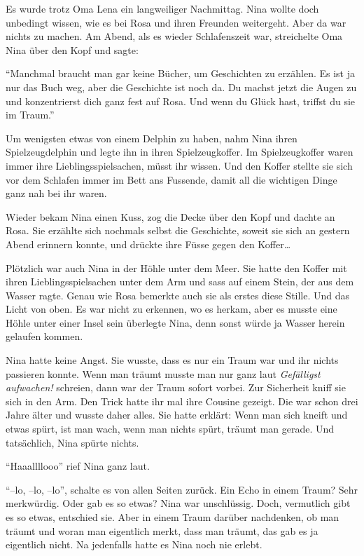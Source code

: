 \begin{mdframed}[style=mystyle]
Es wurde trotz Oma Lena ein langweiliger Nachmittag. Nina wollte doch unbedingt wissen, wie es bei Rosa und ihren Freunden weitergeht. Aber da war nichts zu machen. Am Abend, als es wieder Schlafenszeit war, streichelte Oma Nina über den Kopf und sagte:

\enquote{Manchmal braucht man gar keine Bücher, um Geschichten zu erzählen. Es ist ja nur das Buch weg, aber die Geschichte ist noch da. Du machst jetzt die Augen zu und konzentrierst dich ganz fest auf Rosa. Und wenn du Glück hast, triffst du sie im Traum.}

Um wenigsten etwas von einem Delphin zu haben, nahm Nina ihren Spielzeugdelphin und legte ihn in ihren Spielzeugkoffer. Im Spielzeugkoffer waren immer ihre Lieblingsspielsachen, müsst ihr wissen. Und den Koffer stellte sie sich vor dem Schlafen immer im Bett ans Fussende, damit all die wichtigen Dinge ganz nah bei ihr waren.

Wieder bekam Nina einen Kuss, zog die Decke über den Kopf und dachte an Rosa. Sie erzählte sich nochmals selbst die Geschichte, soweit sie sich an gestern Abend erinnern konnte, und drückte ihre Füsse gegen den Koffer\dots
\end{mdframed}\medskip

Plötzlich war auch Nina in der Höhle unter dem Meer. Sie hatte den Koffer mit ihren Lieblingsspielsachen unter dem Arm und sass auf einem Stein, der aus dem Wasser ragte. Genau wie Rosa bemerkte auch sie als erstes diese Stille. Und das Licht von oben. Es war nicht zu erkennen, wo es herkam, aber es musste eine Höhle unter einer Insel sein überlegte Nina, denn sonst würde ja Wasser herein gelaufen kommen.

Nina hatte keine Angst. Sie wusste, dass es nur ein Traum war und ihr nichts passieren konnte. Wenn man träumt musste man nur ganz laut {\it Gefälligst aufwachen!} schreien, dann war der Traum sofort vorbei. Zur Sicherheit kniff sie sich in den Arm. Den Trick hatte ihr mal ihre Cousine gezeigt. Die war schon drei Jahre älter und wusste daher alles. Sie hatte erklärt: Wenn man sich kneift und etwas spürt, ist man wach, wenn man nichts spürt, träumt man gerade. Und tatsächlich, Nina spürte nichts.

\enquote{Haaallllooo} rief Nina ganz laut.

\enquote{--lo, --lo, --lo}, schalte es von allen Seiten zurück. Ein Echo in einem Traum? Sehr merkwürdig. Oder gab es so etwas? Nina war unschlüssig. Doch, vermutlich gibt es so etwas, entschied sie. Aber in einem Traum darüber nachdenken, ob man träumt und woran man eigentlich merkt, dass man träumt, das gab es ja eigentlich nicht. Na jedenfalls hatte es Nina noch nie erlebt.

